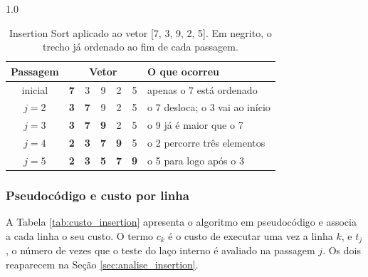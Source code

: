 \begin{spacing}{1.0}
	\begin{table}[htbp]
		\centering
		\caption{Insertion Sort aplicado ao vetor [7, 3, 9, 2, 5]. Em negrito, o trecho já ordenado ao fim de cada passagem.}
		\label{tab:exemplo_insertion}
		\begin{tabular}{c|ccccc|l}
			\hline
			\textbf{Passagem} & \multicolumn{5}{c|}{\textbf{Vetor}} & \textbf{O que ocorreu} \\
			\hline
			inicial & \textbf{7} & 3 & 9 & 2 & 5 & apenas o 7 está ordenado \\
			$j = 2$ & \textbf{3} & \textbf{7} & 9 & 2 & 5 & o 7 desloca; o 3 vai ao início \\
			$j = 3$ & \textbf{3} & \textbf{7} & \textbf{9} & 2 & 5 & o 9 já é maior que o 7 \\
			$j = 4$ & \textbf{2} & \textbf{3} & \textbf{7} & \textbf{9} & 5 & o 2 percorre três elementos \\
			$j = 5$ & \textbf{2} & \textbf{3} & \textbf{5} & \textbf{7} & \textbf{9} & o 5 para logo após o 3 \\
			\hline
		\end{tabular}
	\end{table}
\end{spacing}

\subsubsection{Pseudocódigo e custo por linha}

\indent \qquad A Tabela \ref{tab:custo_insertion} apresenta o algoritmo em
pseudocódigo e associa a cada linha o seu custo. O termo $c_k$ é o custo de
executar uma vez a linha $k$, e $t_j$, o número de vezes que o teste do laço
interno é avaliado na passagem $j$. Os dois reaparecem na Seção
\ref{sec:analise_insertion}.

